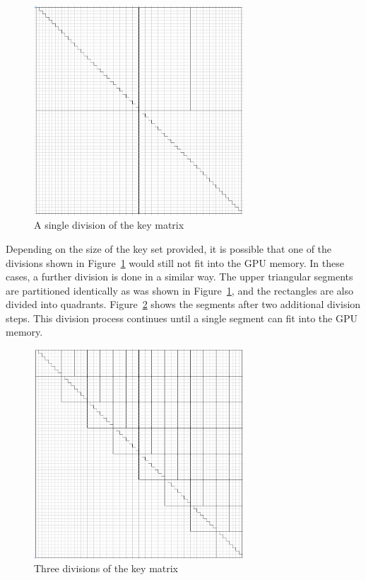 \documentclass[12pt]{ucthesis}
\begin{document}
\begin{figure}
   \centering
   \includegraphics[width=0.7\textwidth]{one_division}
   \caption{A single division of the key matrix}
   \label{fig:divkeys1}
\end{figure}

Depending on the size of the key set provided, it is possible that one of the
divisions shown in Figure~\ref{fig:divkeys1} would still not fit into the GPU
memory. In these cases, a further division is done in a similar way. The upper
triangular segments are partitioned identically as was shown in
Figure~\ref{fig:divkeys1}, and the rectangles are also divided into quadrants. 
Figure~\ref{fig:divkeys3} shows the segments after two additional division
steps. This division process continues until a single segment can fit into the
GPU memory.  

\begin{figure}
   \centering
   \includegraphics[width=0.7\textwidth]{three_divisions}
   \caption{Three divisions of the key matrix}
   \label{fig:divkeys3}
\end{figure}
\end{document}
